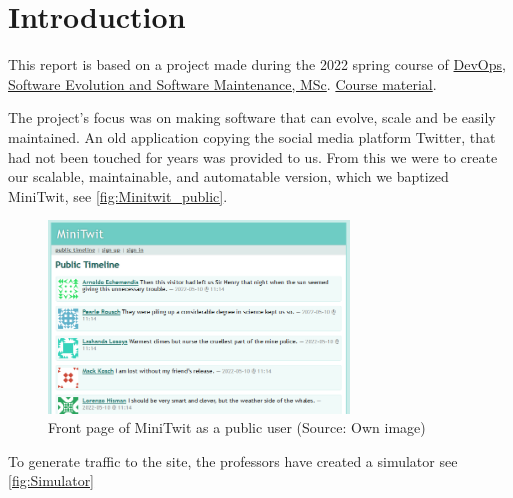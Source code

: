 \section{Introduction}
This report is based on a project made during the 2022 spring course of \href{https://learnit.itu.dk/local/coursebase/view.php?ciid=909}{DevOps, Software Evolution and Software Maintenance, MSc}. \href{https://github.com/itu-devops/lecture_notes/tree/e44664f50c8b0ffb30a77a29e305df3f6750d5d4}{Course material}. 

The project's focus was on making software that can evolve, scale and be easily maintained. An old application copying the social media platform Twitter, that had not been touched for years was provided to us. From this we were to create our scalable, maintainable, and automatable version, which we baptized MiniTwit, see \autoref{fig:Minitwit_public}.

\begin{figure}[!ht]
    \centering
    \captionsetup{justification=centering,margin=1cm}
    \includegraphics[width=80mm]{images/introduction/minitwitFrontPage.png}
    \caption{Front page of MiniTwit as a public user (Source: Own image)}
    \label{fig:Minitwit_public}
\end{figure}

To generate traffic to the site, the professors have created a simulator see \autoref{fig:Simulator}

